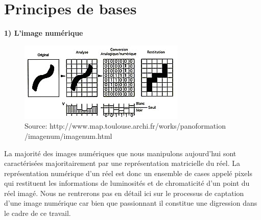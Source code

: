 \documentclass[a4paper,12pt]{article} %
\begin{document}
\section{Principes de bases}
\textbf{1) L'image numérique }\newline
\begin{figure}[h] %
  \centering %
  \includegraphics[scale=0.8]{binaire.jpg} %
  \caption{Source: http://www.map.toulouse.archi.fr/works/panoformation
  /imagenum/imagenum.html } %
\end{figure}
\newline
\par
	La majorité des images numériques que nous manipulons aujourd’hui sont caractérisées majoritairement par une représentation matricielle du réel. La représentation numérique d’un réel est donc un ensemble de cases appelé pixels qui restituent les informations de luminosités et de chromaticité d’un point du réel imagé. Nous ne rentrerons pas en détail ici sur le processus de captation d’une image numérique car bien que passionnant il constitue une digression dans le cadre de ce travail. \newline
\end{document}

